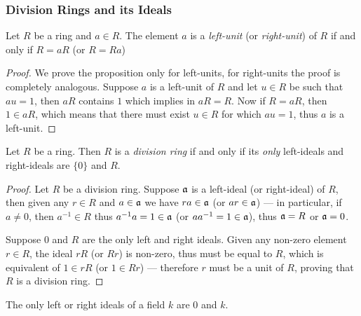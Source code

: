 \subsubsection{Division Rings and its Ideals}

\begin{proposition}
\label{prop:unit-iff-R=aR}
Let \(R\) be a ring and \(a \in R\). The element \(a\) is a \emph{left-unit} (or
\emph{right-unit}) of \(R\) if and only if \(R = a R\) (or \(R = R a\))
\end{proposition}

\begin{proof}
We prove the proposition only for left-units, for right-units the proof is
completely analogous. Suppose \(a\) is a left-unit of \(R\) and let \(u \in R\)
be such that \(a u = 1\), then \(aR\) contains \(1\) which implies in \(a R =
R\). Now if \(R = a R\), then \(1 \in a R\), which means that there must exist
\(u \in R\) for which \(a u = 1\), thus \(a\) is a left-unit.
\end{proof}

\begin{proposition}
\label{prop:division-ring-ideals-are-0-or-ring}
Let \(R\) be a ring. Then \(R\) is a \emph{division ring} if and only if its
\emph{only} left-ideals and right-ideals are \(\{0\}\) and \(R\).
\end{proposition}

\begin{proof}
Let \(R\) be a division ring. Suppose \(\mathfrak{a}\) is a left-ideal (or
right-ideal) of \(R\), then given any \(r \in R\) and \(a \in \mathfrak{a}\) we
have \(r a \in \mathfrak{a}\) (or \(a r \in \mathfrak{a}\)) --- in particular, if
\(a \neq 0\), then \(a^{-1} \in R\) thus \(a^{-1} a = 1 \in \mathfrak{a}\) (or
\(a a^{-1} = 1 \in \mathfrak{a}\)), thus \(\mathfrak{a} = R\) or \(\mathfrak{a} = 0\).

Suppose \(0\) and \(R\) are the only left and right ideals. Given any non-zero
element \(r \in R\), the ideal \(r R\) (or \(R r\)) is non-zero, thus must be
equal to \(R\), which is equivalent of \(1 \in r R\) (or \(1 \in R r\)) ---
therefore \(r\) must be a unit of \(R\), proving that \(R\) is a division ring.
\end{proof}

\begin{corollary}
\label{cor:field-ideals}
The only left or right ideals of a field \(k\) are \(0\) and \(k\).
\end{corollary}

